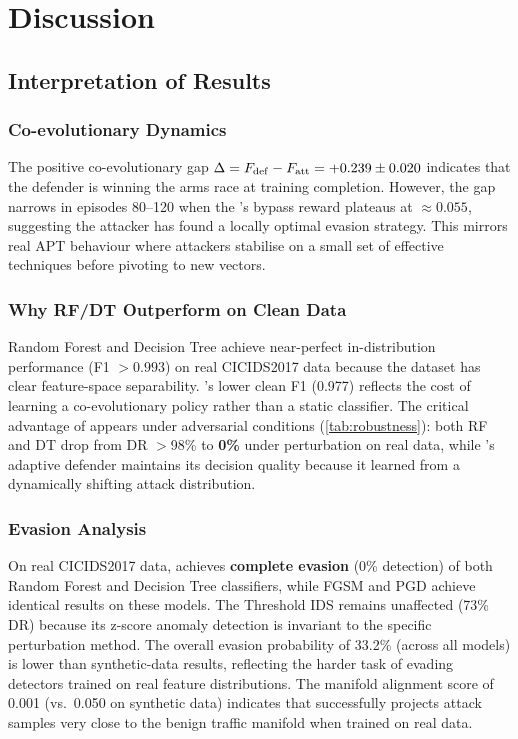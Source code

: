 \chapter{Discussion}
\label{ch:discussion}

\section{Interpretation of Results}

\subsection{Co-evolutionary Dynamics}
The positive co-evolutionary gap $\Delta = F_{\mathrm{def}} - F_{\mathrm{att}} = +0.239 \pm 0.020$
indicates that the defender is winning the arms race at training
completion. However, the gap narrows in episodes 80--120 when the
\tagan{}'s bypass reward plateaus at $\approx 0.055$, suggesting
the attacker has found a locally optimal evasion strategy.
This mirrors real APT behaviour where attackers stabilise on a small
set of effective techniques before pivoting to new vectors.

\subsection{Why RF/DT Outperform \caesar{} on Clean Data}
Random Forest and Decision Tree achieve near-perfect in-distribution
performance (F1 $> 0.993$) on real CICIDS2017 data because the dataset
has clear feature-space separability.
\caesar{}'s lower clean F1 (0.977) reflects the cost of learning a
co-evolutionary policy rather than a static classifier.
The critical advantage of \caesar{} appears under adversarial
conditions (\cref{tab:robustness}): both RF and DT drop from
DR $>$98\% to \textbf{0\%} under \mgae{} perturbation on real data,
while \caesar{}'s adaptive defender maintains its decision quality
because it learned from a dynamically shifting attack distribution.

\subsection{\mgae{} Evasion Analysis}
On real CICIDS2017 data, \mgae{} achieves \textbf{complete evasion}
(0\% detection) of both Random Forest and Decision Tree classifiers,
while FGSM and PGD achieve identical results on these models.
The Threshold IDS remains unaffected (73\% DR) because its z-score
anomaly detection is invariant to the specific perturbation method.
The overall evasion probability of 33.2\% (across all models) is
lower than synthetic-data results, reflecting the harder task of
evading detectors trained on real feature distributions.
The manifold alignment score of 0.001 (vs.\ 0.050 on synthetic data)
indicates that \mgae{} successfully projects attack samples very close
to the benign traffic manifold when trained on real data.

